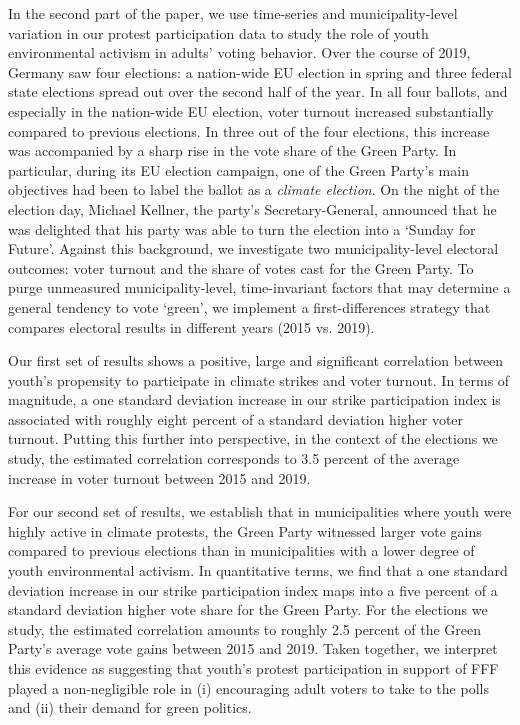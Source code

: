In the second part of the paper, we use time-series and municipality-level variation in our protest participation data to study the role of youth environmental activism in adults' voting behavior. Over the course of 2019, Germany saw four elections: a nation-wide EU election in spring and three federal state elections spread out over the second half of the year. In all four ballots, and especially in the nation-wide EU election, voter turnout increased substantially compared to previous elections. In three out of the four elections, this increase was accompanied by a sharp rise in the vote share of the Green Party. In particular, during its EU election campaign, one of the Green Party's main objectives had been to label the ballot as a \textit{climate election}. On the night of the election day, Michael Kellner, the party's Secretary-General, announced that he was delighted that his party was able to turn the election into a `Sunday for Future'. Against this background, we investigate two municipality-level electoral outcomes: voter turnout and the share of votes cast for the Green Party. To purge unmeasured municipality-level, time-invariant factors that may determine a general tendency to vote `green', we implement a first-differences strategy that compares electoral results in different years (2015 vs. 2019). %

Our first set of results shows a positive, large and significant correlation between youth's propensity to participate in climate strikes and voter turnout. In terms of magnitude, a one standard deviation increase in our strike participation index is associated with roughly eight percent of a standard deviation higher voter turnout. Putting this further into perspective, in the context of the elections we study, the estimated correlation corresponds to 3.5 percent of the average increase in voter turnout between 2015 and 2019. 

For our second set of results, we establish that in municipalities where youth were highly active in climate protests, the Green Party witnessed larger vote gains compared to previous elections than in municipalities with a lower degree of youth environmental activism. In quantitative terms, we find that a one standard deviation increase in our strike participation index maps into a five percent of a standard deviation higher vote share for the Green Party. For the elections we study, the estimated correlation amounts to roughly 2.5 percent of the Green Party's average vote gains between 2015 and 2019. Taken together, we interpret this evidence as suggesting that youth's protest participation in support of FFF played a non-negligible role in (i) encouraging adult voters to take to the polls and (ii) their demand for green politics. 

